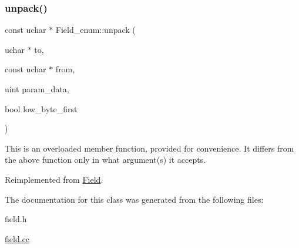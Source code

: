 \subsubsection{\texorpdfstring{unpack()}{unpack()}}
{\footnotesize\ttfamily const uchar $\ast$ Field\+\_\+enum\+::unpack (\begin{DoxyParamCaption}\item[{uchar $\ast$}]{to,  }\item[{const uchar $\ast$}]{from,  }\item[{uint}]{param\+\_\+data,  }\item[{bool}]{low\+\_\+byte\+\_\+first }\end{DoxyParamCaption})\hspace{0.3cm}{\ttfamily [virtual]}}

This is an overloaded member function, provided for convenience. It differs from the above function only in what argument(s) it accepts.

Reimplemented from \mbox{\hyperlink{classField_a42f448ff2c939d91949f7635d939b16b}{Field}}.



The documentation for this class was generated from the following files\+:\begin{DoxyCompactItemize}
\item 
field.\+h\item 
\mbox{\hyperlink{field_8cc}{field.\+cc}}\end{DoxyCompactItemize}
